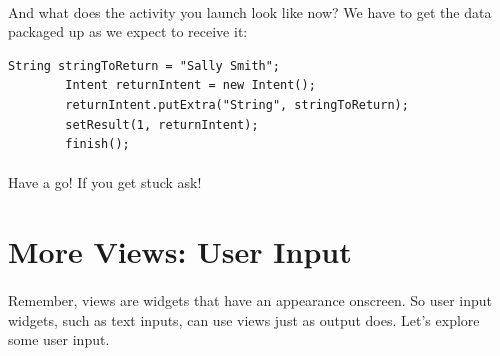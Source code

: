\documentclass[12pt, a4paper, twoside]{book}
\begin{document}
\paragraph{} And what does the activity you launch look like now? We have to get the data packaged up as we expect to receive it:

\begin{lstlisting}
String stringToReturn = "Sally Smith";
        Intent returnIntent = new Intent();
        returnIntent.putExtra("String", stringToReturn);
        setResult(1, returnIntent);
        finish();
\end{lstlisting}

\paragraph{} Have a go! If you get stuck ask!





\section{More Views: User Input}
\paragraph{} Remember, views are widgets that have an appearance onscreen. So user input widgets, such as text inputs, can use views just as output does. Let's explore some user input.
\end{document}

